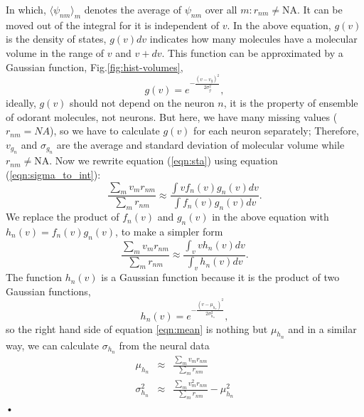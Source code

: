 \documentclass[11pt]{paper} %
\begin{document}
In which, 
$\langle \psi_{nm} \rangle_m$ denotes the average of $\psi_{nm}$ over all $m: r_{nm} \neq \text{NA}$. 
It can be moved out of the integral for it is independent of $v$.
In the above equation, 
$g(v)$ is the density of states, $g(v) dv$ indicates how many molecules have a molecular volume in the range of $v$ and $v+dv$.
This function can be approximated by a Gaussian function, Fig.\ref{fig:hist-volumes}, 
\begin{equation}
	g(v) = e^{-\frac{(v- v_{g})^2}{2 \sigma_{g}^2}},
	\label{eqn:hist-volumes}
\end{equation}
ideally, $g(v)$ should not depend on the neuron $n$, 
it is the property of ensemble of odorant molecules, not neurons. 
But here, we have many missing values ($r_{nm} = NA$), 
so we have to calculate $g(v)$ for each neuron separately; 
Therefore, $v_{g_n}$ and $\sigma_{g_n}$ are the average and standard deviation of molecular volume while $r_{nm} \neq \text{NA}$.
Now we rewrite equation (\ref{eqn:sta}) using equation (\ref{eqn:sigma_to_int}):
\begin{equation}
	\frac{\displaystyle \sum_{m} v_m r_{nm}}{\displaystyle \sum_{m} r_{nm}} \approx \frac{\displaystyle \int v f_n(v) g_n(v) dv}{\displaystyle \int f_n(v) g_n(v) dv}.
	\label{eqn:sta_int}
\end{equation}
We replace the product of $f_n(v)$ and $g_n(v)$ in the above equation with $h_n(v) = f_n(v) g_n(v)$, to make a simpler form
\begin{equation}
	\frac{\displaystyle \sum_{m} v_m r_{nm}}{\displaystyle \sum_{m} r_{nm}} \approx \frac{\displaystyle \int_v v h_n(v) dv}{ \displaystyle \int_v  h_n(v) dv }.
	\label{eqn:mean}
\end{equation}
The function $h_n(v)$ is a Gaussian function because it is the product of two Gaussian functions, 
\begin{equation}
h_n(v) = e^{-\frac{(v-\mu_{h_n})^2}{2\sigma_{h_n}^2}}, 
\end{equation}
so the right hand side of equation \ref{eqn:mean} is nothing but $\mu_{h_n}$ and 
in a similar way, we can calculate $\sigma_{h_n}$ from the neural data
\begin{eqnarray}
	\mu_{h_n} &\approx& \frac{\displaystyle \sum_{m} v_m r_{nm}}{\displaystyle \sum_{m} r_{nm}} \\
	\sigma_{h_n}^2 &\approx& \frac{\displaystyle \sum_{m} v_m^2 r_{nm}}{\displaystyle \sum_{m} r_{nm}} - \mu_{h_n}^2
	\label{eqn:final_h}
\end{eqnarray}•
\end{document}
